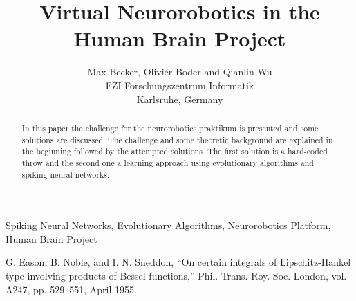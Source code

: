 \documentclass[conference]{IEEEtran}
\begin{document}
\title{Virtual Neurorobotics in the Human Brain Project}
\author{Max Becker, Olivier Boder and Qianlin Wu\\FZI Forschungszentrum Informatik\\Karlsruhe, Germany}

\maketitle
\thispagestyle{plain}
\pagestyle{plain}

\begin{abstract}
In this paper the challenge for the neurorobotics praktikum is presented and some solutions are discussed.
The challenge and some theoretic background are explained in the beginning followed by the attempted solutions.
The first solution is a hard-coded throw and the second one a learning approach using evolutionary algorithms and spiking neural networks.
\end{abstract}


\begin{IEEEkeywords}
Spiking Neural Networks, Evolutionary Algorithms, Neurorobotics Platform, Human Brain Project
\end{IEEEkeywords}












\begin{thebibliography}{00}
 G. Eason, B. Noble, and I. N. Sneddon, ``On certain integrals of Lipschitz-Hankel type involving products of Bessel functions,'' Phil. Trans. Roy. Soc. London, vol. A247, pp. 529--551, April 1955.
\end{thebibliography}
\end{document}
